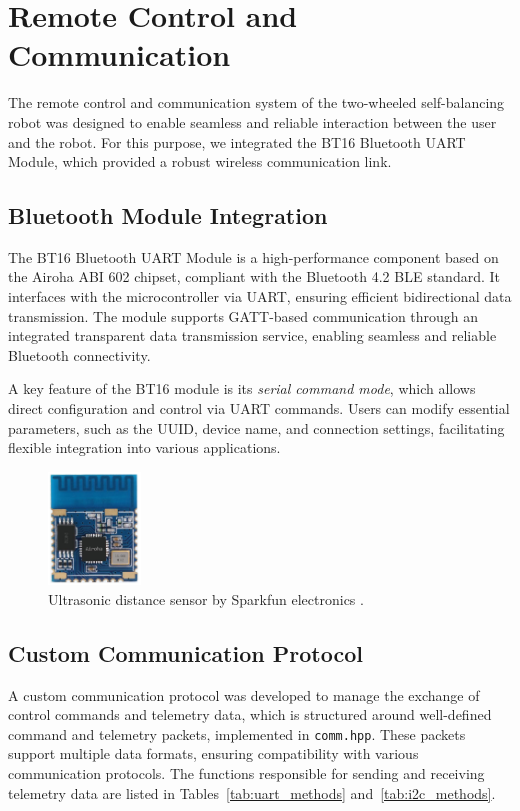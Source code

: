\section{Remote Control and Communication}

The remote control and communication system of the two-wheeled self-balancing robot was designed to enable seamless and reliable interaction between the user and the robot. For this purpose, we integrated the BT16 Bluetooth UART Module, which provided a robust wireless communication link.

\subsection{Bluetooth Module Integration}
The BT16 Bluetooth UART Module is a high-performance component based on the Airoha ABI 602 chipset, compliant with the Bluetooth 4.2 BLE standard. It interfaces with the microcontroller via UART, ensuring efficient bidirectional data transmission. The module supports GATT-based communication through an integrated transparent data transmission service, enabling seamless and reliable Bluetooth connectivity.

A key feature of the BT16 module is its \textit{serial command mode}, which allows direct configuration and control via UART commands. Users can modify essential parameters, such as the UUID, device name, and connection settings, facilitating flexible integration into various applications.


\begin{figure}[H]
	\centering
	\includegraphics[height=3cm]{assets/BT16Module.png}
	\caption{Ultrasonic distance sensor by  Sparkfun electronics \cite{bluetooth_module}.}
	\label{fig:bluetooth}
\end{figure}



\subsection{Custom Communication Protocol}
A custom communication protocol was developed to manage the exchange of control commands and telemetry data, which is structured around well-defined command and telemetry packets, implemented in \texttt{comm.hpp}. These packets support multiple data formats, ensuring compatibility with various communication protocols. The functions responsible for sending and receiving telemetry data are listed in Tables~\ref{tab:uart_methods} and~\ref{tab:i2c_methods}.


